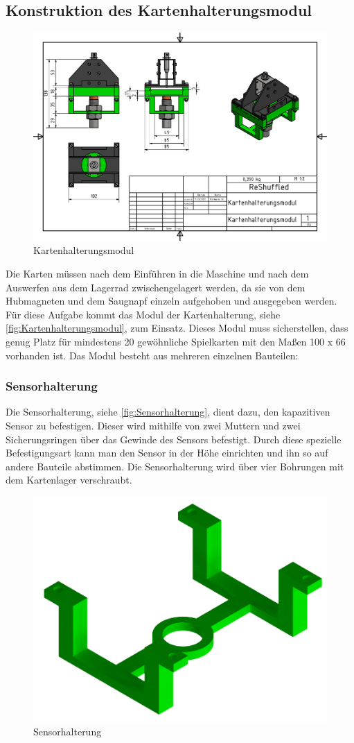 \subsection{Konstruktion des Kartenhalterungsmodul}
\begin{figure}[H]
    \centering
    \includegraphics[width=7 cm]{fig/mech/Kartenhalterungsmodul}
    \caption{Kartenhalterungsmodul}
    \label{fig:Kartenhalterungsmodul}
\end{figure}
Die Karten müssen nach dem Einführen in die Maschine und nach dem Auswerfen aus dem Lagerrad zwischengelagert werden, da sie von dem Hubmagneten und dem Saugnapf einzeln aufgehoben und ausgegeben werden.
Für diese Aufgabe kommt das Modul der Kartenhalterung, siehe \autoref{fig:Kartenhalterungsmodul}, zum Einsatz.
Dieses Modul muss sicherstellen, dass genug Platz für mindestens 20 gewöhnliche Spielkarten  mit den Maßen 100 x 66 vorhanden ist.
Das Modul besteht aus mehreren einzelnen Bauteilen:



\subsubsection{Sensorhalterung}

Die Sensorhalterung, siehe \autoref{fig:Sensorhalterung}, dient dazu, den kapazitiven Sensor zu befestigen.
Dieser wird mithilfe von zwei Muttern und zwei Sicherungsringen über das Gewinde des Sensors befestigt.
Durch diese spezielle Befestigungsart kann man den Sensor in der Höhe einrichten und ihn so auf andere Bauteile abstimmen.
Die Sensorhalterung wird über vier Bohrungen mit dem Kartenlager verschraubt.
\begin{figure}[H]
    \centering
    \includegraphics[width=8 cm]{fig/mech/SensorhalterungNeu.png}
    \caption{Sensorhalterung}
    \label{fig:Sensorhalterung}
\end{figure}


